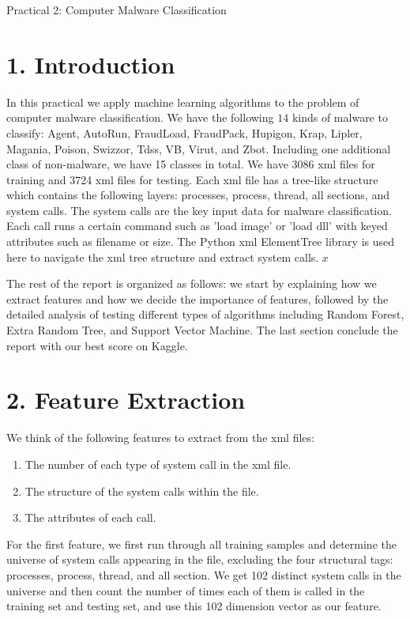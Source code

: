 \documentclass[submit]{harvardml}
\begin{document}
\begin{center}
{\Large Practical 2: Computer Malware Classification}\\
\end{center}

\section*{1. Introduction}
In this practical we apply machine learning algorithms to the problem of computer malware classification. We have the following $14$ kinds of malware to classify: Agent, AutoRun, FraudLoad, FraudPack, Hupigon, Krap, Lipler, Magania, Poison, Swizzor, Tdss, VB, Virut, and Zbot. Including one additional class of non-malware, we have 15 classes in total. We have 3086 xml files for training and 3724 xml files for testing. Each xml file has a tree-like structure which contains the following layers: processes, process, thread, all sections, and system calls. The system calls are the key input data for malware classification. Each call runs a certain command such as 'load image' or 'load dll' with keyed attributes such as filename or size. The Python xml ElementTree library is used here to navigate the xml tree structure and extract system calls.
$x$

The rest of the report is organized as follows: we start by explaining how we extract features and how we decide the importance of features, followed by the detailed analysis of testing different types of algorithms including Random Forest, Extra Random Tree, and Support Vector Machine. The last section conclude the report with our best score on Kaggle.
\section*{2. Feature Extraction}
We think of the following features to extract from the xml files:
\begin{enumerate}
\item The number of each type of system call in the xml file.
\item The structure of the system calls within the file.
\item The attributes of each call.
\end{enumerate}
For the first feature, we first run through all training samples and determine the universe of system calls appearing in the file, excluding the four structural tags: processes, process, thread, and all section. We get 102 distinct system calls in the universe and then count the number of times each of them is called in the training set and testing set, and use this 102 dimension vector as our feature. 
\end{document}
